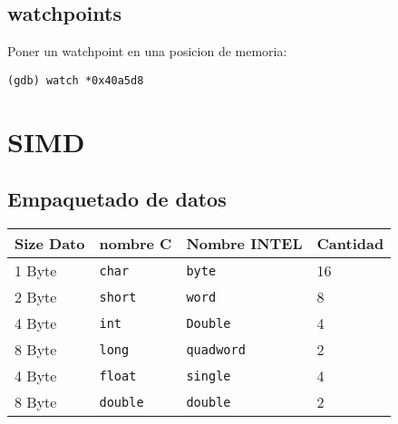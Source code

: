 \documentclass{article}
\begin{document}
\subsection{watchpoints}
Poner un watchpoint en una posicion de memoria:
\begin{verbatim}
(gdb) watch *0x40a5d8
\end{verbatim}

\section{SIMD}

\subsection{Empaquetado de datos}

\begin{tabular}{l l l l}
    \toprule
    \textbf{Size Dato} & \textbf{nombre C} & \textbf{Nombre INTEL} & \textbf{Cantidad} \\
    \midrule
    1 Byte & \texttt{char}   & \texttt{byte}     & 16 \\
    2 Byte & \texttt{short}  & \texttt{word}     & 8  \\
    4 Byte & \texttt{int}    & \texttt{Double}   & 4  \\
    8 Byte & \texttt{long}   & \texttt{quadword} & 2  \\
    \midrule
    4 Byte & \texttt{float}  & \texttt{single}   & 4  \\
    8 Byte & \texttt{double} & \texttt{double}   & 2  \\
    \bottomrule
\end{tabular}
\end{document}
